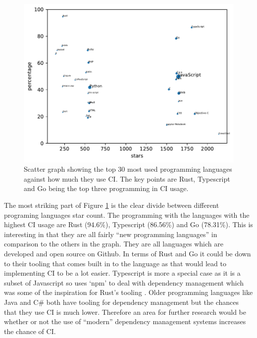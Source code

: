 \documentclass[10pt,conference]{IEEEtran}
\begin{document}
\begin{figure}[!h]
  \centering
  \includegraphics[width=.8\textwidth]{../src/results/languages-scatter-CI.pdf}
  \caption{Scatter graph showing the top 30 most used programming languages against how much they use CI. The key points are Rust, Typescript and Go being the top three programming in CI usage.}
  \label{graph:scatter_langauges_CI}
\end{figure}


The most striking part of Figure \ref{graph:scatter_langauges_CI} is the clear divide between different programing languages star count. The programming with the languages with the highest CI usage are Rust (94.6\%), Typescript (86.56\%) and Go (78.31\%). This is interesting in that they are all fairly \enquote{new programming languages} in comparison to the others in the graph. They are all languages which are developed and open source on Github. In terms of Rust and Go it could be down to their tooling that comes built in to the language as that would lead to implementing CI to be a lot easier. Typescript is more a special case as it is a subset of Javascript so uses `npm' to deal with dependency management which was some of the inspiration for Rust's tooling \citet{RustBlogCargo}. Older programming languages like Java and C\# both have tooling for dependency management but the chances that they use CI is much lower. Therefore an area for further research would be whether or not the use of \enquote{modern} dependency management systems increases the chance of CI.
\end{document}
